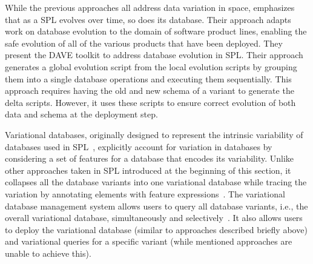 While the previous approaches all address data variation in space, 
\cite{dbSPLevolve} emphasizes that as a SPL evolves over time, so does its
database. Their approach adapts work on database evolution to the
domain of software product lines, enabling the safe evolution of all of the
various products that have been deployed.
%
 They present the DAVE toolkit to address database evolution in SPL. Their
 approach generates a global evolution script from the local evolution scripts
 by grouping them into a single database operations and executing them
 sequentially. This approach requires having the old and new schema of a
 variant to generate the delta scripts. However, it uses these scripts to
 ensure correct evolution of both data and schema at the deployment step. 

 Variational databases, originally designed to represent the intrinsic
 variability of databases used in SPL~\cite{ATW18poly}, explicitly account for
 variation in databases by considering a set of features for a database that
 encodes its variability. Unlike other approaches taken in SPL introduced at
 the beginning of this section, it collapses all the database variants into
 one variational database while tracing the variation by annotating elements
 with feature expressions~\cite{ATW17dbpl}. The variational database
 management system allows users to query all database variants, i.e., the
 overall variational database, simultaneously and
 selectively~\cite{vldbArXiv}. It also allows users to deploy the variational
 database (similar to approaches described briefly above) and variational
 queries for a specific variant (while mentioned approaches are unable to
 achieve this).